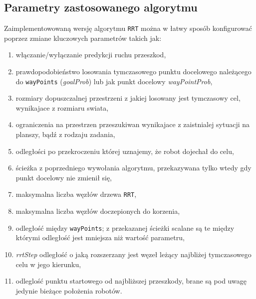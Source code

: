 \subsection{Parametry zastosowanego algorytmu}
Zaimplementowowaną wersję algorytmu \texttt{RRT} można w łatwy sposób konfigurować poprzez zmiane kluczowych parametrów takich jak: 
\begin{enumerate}
 \item włączanie/wyłączanie predykcji ruchu przeszkod,
 \item prawdopodobieństwo losowania tymczasowego punktu docelowego należącego do \texttt{wayPoints} (\textit{goalProb}) lub jak punkt docelowy \textit{wayPointProb},
 \item rozmiary dopuszczalnej przestrzeni z jakiej losowany jest tymczasowy cel, wynikajace z rozmiaru swiata,
 \item ograniczenia na przestrzen przeszukiwan wynikajace z zaistnialej sytuacji na planszy, bądź z rodzaju zadania,
 \item odległości po przekroczeniu której uznajemy, że robot dojechał do celu,
 \item ścieżka z poprzedniego wywołania algorytmu, przekazywana tylko wtedy gdy punkt docelowy nie zmienił się,
 \item maksymalna liczba węzłów drzewa \texttt{RRT},
 \item maksymalna liczba węzłów doczepionych do korzenia,
 \item odległość między \texttt{wayPoints}; z przekazanej ścieżki scalane są te między którymi odległość jest mniejsza niż wartość parametru,
 \item \textit{rrtStep} odległość o jaką rozszerzany jest węzeł leżący najbliżej tymczasowego celu w jego kierunku,
 \item odleglość punktu startowego od najbliższej przeszkody, brane są pod uwagę jedynie bieżące położenia robotów. 
\end{enumerate}